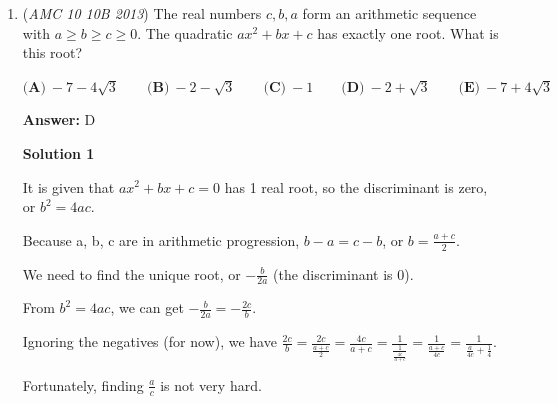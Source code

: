 \begin{enumerate}
 We can see a pattern here. The pattern is every hundred you go down, you have $1$ more solution. Therefore, we have $1+0+1+2+3+4+5+6+7+8+9$ which is = $\boxed{\textbf{(D)}46}$ .

 


 



\textbf{Solution 4}

Let our number be $\underline{a}\;\underline{b}\;\underline{c}\;\underline{d}$. Most of the valid numbers have $a=1$ ($2002$ is the only exception). We know $a+b+c=d$, so $1+b+c=d$ (we are assuming $\underline{a}=1$  here). We can now use the stars and bars formula: $\binom{(d-1)+2-1}{2-1}$, since we have $(d-1)$ $1$'s to split into $2$ groups the (the $d-1$ is because we are reserving $1$ "unit" for the thousands digit, since $\underline{a}$ can't be $0$). By increasing the value of $d$ by $1$ each time, we get the total sum to be $\binom{1}{1} + \binom{2}{1} + \cdots + \binom{9}{1}$=$1+2+3+...9=45$. However, this doesn't include the number $2002$, since we set $a=1$, so the final answer is $45+1=\boxed{\textbf{(D)}46}$.

 


	\item (\textit{AMC 10 10B 2013}) The real numbers $c,b,a$ form an arithmetic sequence with $a\ge b\ge c\ge 0$. The quadratic $ax^2+bx+c$ has exactly one root. What is this root?


 $\textbf{(A)}\ -7-4\sqrt{3}\qquad\textbf{(B)}\ -2-\sqrt{3}\qquad\textbf{(C)}\ -1\qquad\textbf{(D)}\ -2+\sqrt{3}\qquad\textbf{(E)}\ -7+4\sqrt{3}$

 \textbf{Answer: }D



\textbf{Solution 1}

It is given that $ax^2+bx+c=0$ has 1 real root, so the discriminant is zero, or $b^2=4ac$. 

 Because a, b, c are in arithmetic progression, $b-a=c-b$, or $b=\frac {a+c} {2}$.

 We need to find the unique root, or $-\frac {b} {2a}$ (the discriminant is 0).

 From $b^2=4ac$, we can get $-\frac {b} {2a} =-\frac {2c} {b}$.

 Ignoring the negatives (for now), we have $\frac {2c} {b} = \frac {2c} {\frac {a+c} {2}} = \frac {4c} {a+c} = \frac {1} {\frac {1} {\frac {4c} {a+c}}} = \frac {1} {\frac {a+c} {4c}} = \frac {1} {\frac {a} {4c} + \frac {1} {4} }$.

 Fortunately, finding $\frac {a} {c}$ is not very hard.


\end{enumerate}
